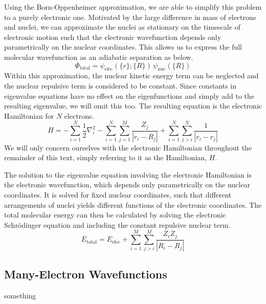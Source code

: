 Using the Born-Oppenheimer approximation, we are able to simplify this problem to a purely electronic one. Motivated by the large difference in mass of electrons and nuclei, we can approximate the nuclei as stationary on the timescale of electronic motion such that the electronic wavefunction depends only parametrically on the nuclear coordinates. This allows us to express the full molecular wavefunction as an adiabatic separation as below.
\begin{equation*}
    \Phi_\text{total} =
    \psi_\text{elec}({\{r\}};\{R\}) \,
    \psi_\text{nuc}(\{R\})
\end{equation*}
Within this approximation, the nuclear kinetic energy term can be neglected and the nuclear repulsive term is considered to be constant. Since constants in eigenvalue equations have no effect on the eigenfunctions and simply add to the resulting eigenvalue, we will omit this too. The resulting equation is the electronic Hamiltonian for $N$ electrons. 
\begin{equation*}
    H =
    - \sum_{i=1}^{N} \frac{1}{2} \nabla^{2}_{i}
    - \sum_{i=1}^{N} \sum_{j=1}^{M} \frac{Z_j}{|r_{i} - R_{j}|}
    + \sum_{i=1}^{N} \sum_{j>i}^{N} \frac{1}{|r_{i} - r_{j}|}
\end{equation*}
We will only concern ourselves with the electronic Hamiltonian throughout the remainder of this text, simply referring to it as the Hamiltonian, $H$.

The solution to the eigenvalue equation involving the electronic Hamiltonian is the electronic wavefunction, which depends only parametrically on the nuclear coordinates. It is solved for fixed nuclear coordinates, such that different arrangements of nuclei yields different functions of the electronic coordinates. The total molecular energy can then be calculated by solving the electronic Schrödinger equation and including the constant repulsive nuclear term.
\begin{equation*}
    E_\text{total} = E_\text{elec} + \sum_{i=1}^{M} \sum_{j>i}^{M} \frac{Z_{i} Z_{j}}{|R_{i} - R_{j}|}
\end{equation*}


\subsection{Many-Electron Wavefunctions}
something


